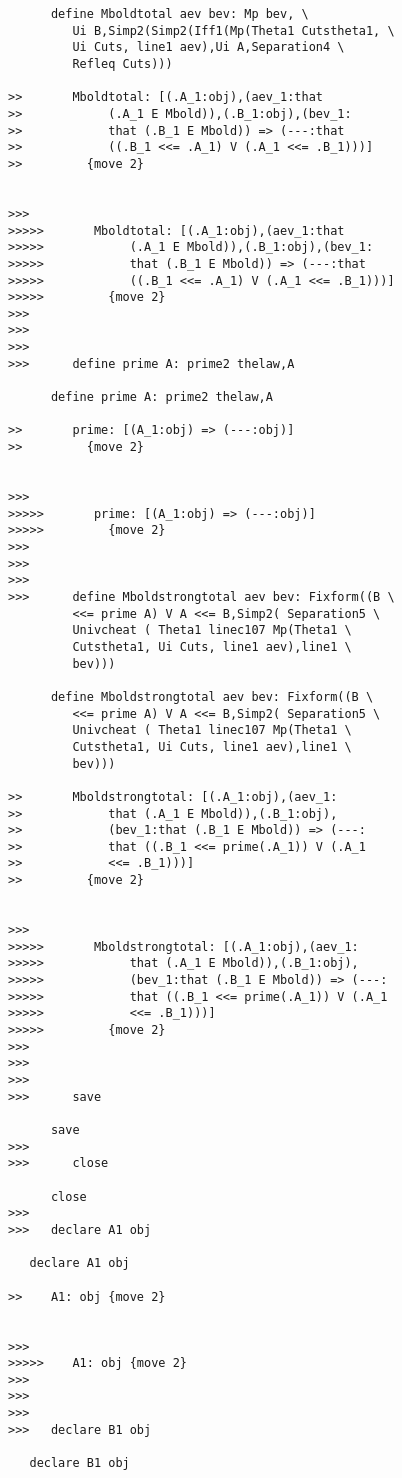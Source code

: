 \documentclass[12pt]{article}
\begin{document}
\begin{verbatim}
      define Mboldtotal aev bev: Mp bev, \
         Ui B,Simp2(Simp2(Iff1(Mp(Theta1 Cutstheta1, \
         Ui Cuts, line1 aev),Ui A,Separation4 \
         Refleq Cuts)))

>>       Mboldtotal: [(.A_1:obj),(aev_1:that
>>            (.A_1 E Mbold)),(.B_1:obj),(bev_1:
>>            that (.B_1 E Mbold)) => (---:that
>>            ((.B_1 <<= .A_1) V (.A_1 <<= .B_1)))]
>>         {move 2}


>>>
>>>>>       Mboldtotal: [(.A_1:obj),(aev_1:that
>>>>>            (.A_1 E Mbold)),(.B_1:obj),(bev_1:
>>>>>            that (.B_1 E Mbold)) => (---:that
>>>>>            ((.B_1 <<= .A_1) V (.A_1 <<= .B_1)))]
>>>>>         {move 2}
>>>
>>>
>>>
>>>      define prime A: prime2 thelaw,A

      define prime A: prime2 thelaw,A

>>       prime: [(A_1:obj) => (---:obj)]
>>         {move 2}


>>>
>>>>>       prime: [(A_1:obj) => (---:obj)]
>>>>>         {move 2}
>>>
>>>
>>>
>>>      define Mboldstrongtotal aev bev: Fixform((B \
         <<= prime A) V A <<= B,Simp2( Separation5 \
         Univcheat ( Theta1 linec107 Mp(Theta1 \
         Cutstheta1, Ui Cuts, line1 aev),line1 \
         bev)))

      define Mboldstrongtotal aev bev: Fixform((B \
         <<= prime A) V A <<= B,Simp2( Separation5 \
         Univcheat ( Theta1 linec107 Mp(Theta1 \
         Cutstheta1, Ui Cuts, line1 aev),line1 \
         bev)))

>>       Mboldstrongtotal: [(.A_1:obj),(aev_1:
>>            that (.A_1 E Mbold)),(.B_1:obj),
>>            (bev_1:that (.B_1 E Mbold)) => (---:
>>            that ((.B_1 <<= prime(.A_1)) V (.A_1
>>            <<= .B_1)))]
>>         {move 2}


>>>
>>>>>       Mboldstrongtotal: [(.A_1:obj),(aev_1:
>>>>>            that (.A_1 E Mbold)),(.B_1:obj),
>>>>>            (bev_1:that (.B_1 E Mbold)) => (---:
>>>>>            that ((.B_1 <<= prime(.A_1)) V (.A_1
>>>>>            <<= .B_1)))]
>>>>>         {move 2}
>>>
>>>
>>>
>>>      save

      save
>>>
>>>      close

      close
>>>
>>>   declare A1 obj

   declare A1 obj

>>    A1: obj {move 2}


>>>
>>>>>    A1: obj {move 2}
>>>
>>>
>>>
>>>   declare B1 obj

   declare B1 obj


\end{verbatim}
\end{document}
